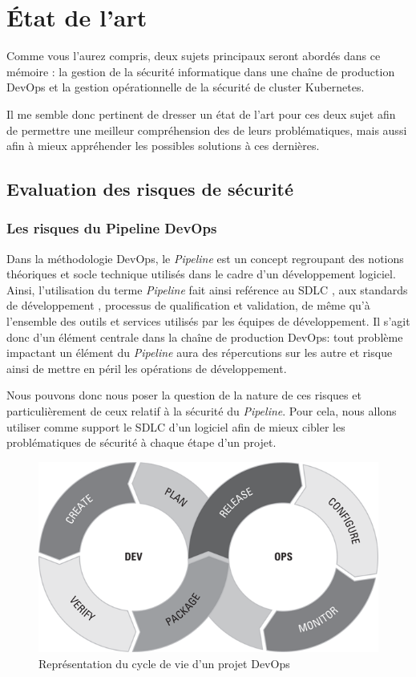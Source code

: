 \chapter{État de l'art}

Comme vous l'aurez compris, deux sujets principaux seront abordés dans ce mémoire : la gestion de la sécurité informatique
dans une chaîne de production DevOps et la gestion opérationnelle de la sécurité de cluster Kubernetes. 

Il me semble donc pertinent de dresser un état de l'art pour ces deux sujet afin de permettre une meilleur compréhension des
de leurs problématiques, mais aussi afin à mieux appréhender les possibles solutions à ces dernières.

\section{Evaluation des risques de sécurité}
\subsection{Les risques du Pipeline DevOps}

Dans la méthodologie DevOps, le \emph{Pipeline} est un concept regroupant des notions théoriques et socle technique utilisés dans 
le cadre d'un développement logiciel. Ainsi, l'utilisation du terme \emph{Pipeline} fait ainsi reférence au \ac{SDLC}
\autocite[Ch.\ 6]{devops_for_dummies_freeman_forsgren_2019}, aux standards de développement
\autocite[Ch.\ 9]{devops_for_dummies_freeman_forsgren_2019}, processus de qualification et 
validation, de même qu'à l'ensemble des outils et services utilisés par les équipes de développement. Il s'agit donc d'un élément
centrale dans la chaîne de production DevOps: tout problème impactant un élément du \emph{Pipeline} aura des répercutions sur les 
autre et risque ainsi de mettre en péril les opérations de développement.

Nous pouvons donc nous poser la question de la nature de ces risques et particulièrement de ceux relatif à la sécurité du 
\emph{Pipeline}. Pour cela, nous allons utiliser comme support le \ac{SDLC} d'un logiciel afin de mieux cibler les problématiques
de sécurité à chaque étape d'un projet.

\begin{figure}
    \centering
    \includegraphics[width=0.5\linewidth]{resources/img/devops_lifecycle.png}
    \caption{Représentation du cycle de vie d'un projet DevOps}
    \label{fig:devops-lifecycle}
  \end{figure}
\newpage

